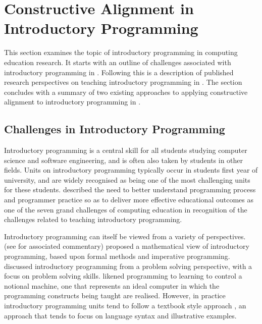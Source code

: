 


\clearpage
\section{Constructive Alignment in Introductory Programming} %
\label{sec:constructive_alignment_in_introductory_programming}

This section examines the topic of introductory programming in computing education research. It starts with an outline of challenges associated with introductory programming in . Following this is a description of published research perspectives on teaching introductory programming in . The section concludes with a summary of two existing approaches to applying constructive alignment to introductory programming in .

\subsection{Challenges in Introductory Programming} %
\label{sub:challenges_in_introductory_programming}

Introductory programming is a central skill for all students studying computer science and software engineering, and is often also taken by students in other fields. Units on introductory programming typically occur in students first year of university, and are widely recognised as being one of the most challenging units for these students. \citet{McGettrick:2005} described the need to better understand programming process and programmer practice so as to  deliver more effective educational outcomes as one of the seven grand challenges of computing education in recognition of the challenges related to teaching introductory programming.

Introductory programming can itself be viewed from a variety of perspectives. \citet{Dijkstra:1989} (see \citet{Denning:1989} for associated commentary) proposed a mathematical view of introductory programming, based upon formal methods and imperative programming. \citet{Palumbo:1990} discussed introductory programming from a problem solving perspective, with a focus on problem solving skills. \citet{DuBoulay:1986} likened programming to learning to control a notional machine, one that represents an ideal computer in which the programming constructs being taught are realised. However, in practice introductory programming units tend to follow a textbook style approach \cite{Robins:2003}, an approach that tends to focus on language syntax and illustrative examples. 


